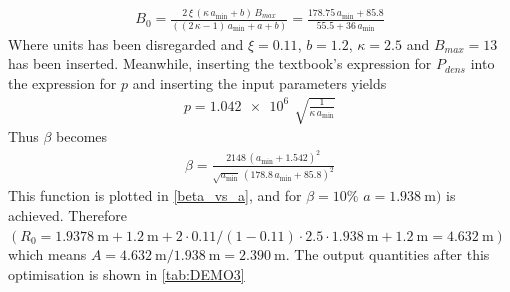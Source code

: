 \begin{align}
	B_{0}=\frac{2\,\xi\,(\kappa\, a_{\min}+b)\, B_{max}}{((2\,\kappa-1)\, a_{\min}+a+b)}=\frac{178.75\, a_{\min}+85.8}{55.5+36\, a_{\min}}
\end{align}
Where units has been disregarded and $\xi=0.11$, $b=1.2$, $\kappa=2.5$ and $B_{\si{max}}=13$ has been inserted. Meanwhile, inserting the textbook's expression for $P_{\si{dens}}$ into the expression for $p$ and inserting the input parameters yields
\begin{align}
	p=\SI{1.042e6}{}\,\sqrt{\frac{1}{\kappa\, a_{\min}}}
\end{align}
Thus \(\beta\) becomes
\begin{align}
	\beta=\frac{2148\,(a_{\min}+1.542)^{2}}{\sqrt{a_{\min}}\,(178.8\, a_{\min}+85.8)^{2}}
\end{align}
This function is plotted in \cref{beta_vs_a}, and for $\beta=10\%$ $a=\SI{1.938}{\meter})$ is achieved. Therefore $(R_{0}=\SI{1.9378}{\meter}+\SI{1.2}{\meter}+2\cdot 0.11/(1-0.11)\cdot 2.5\cdot \SI{1.938}{\meter}+\SI{1.2}{\meter}=\SI{4.632}{\meter})$ which means $A=\SI{4.632}{\meter}/\SI{1.938}{\meter}=\SI{2.390}{\meter}$. The output quantities after this optimisation is shown in \cref{tab:DEMO3}
